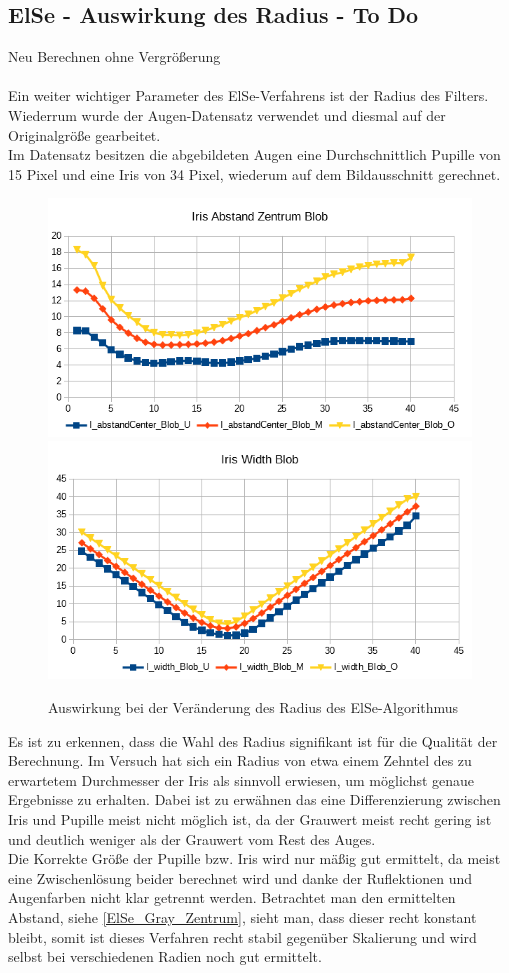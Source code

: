 \subsection{ElSe - Auswirkung des Radius - To Do}
Neu Berechnen ohne Vergrößerung\\\\
Ein weiter wichtiger Parameter des ElSe-Verfahrens ist der Radius des Filters. Wiederrum wurde der Augen-Datensatz \cite{database_Eye} verwendet und diesmal auf der Originalgröße gearbeitet.\\
Im Datensatz besitzen die abgebildeten Augen eine Durchschnittlich Pupille von 15 Pixel und eine Iris von 34 Pixel, wiederum auf dem Bildausschnitt gerechnet.
\begin{figure}
	\centering
	\includegraphics[width=0.45\linewidth]{ElSe_Img/Gray_Alt_Abst}
	\includegraphics[width=0.45\linewidth]{ElSe_Img/Gray_Alt_Wid}
	\caption{Auswirkung bei der Veränderung des Radius des ElSe-Algorithmus}
	\label{ElSE_Radius}
\end{figure}
Es ist zu erkennen, dass die Wahl des Radius signifikant ist für die Qualität der Berechnung. Im Versuch hat sich ein Radius von etwa einem Zehntel des zu erwartetem Durchmesser der Iris als sinnvoll erwiesen, um möglichst genaue Ergebnisse zu erhalten. Dabei ist zu erwähnen das eine Differenzierung zwischen Iris und Pupille meist nicht möglich ist, da der Grauwert meist recht gering ist und deutlich weniger als der Grauwert vom Rest des Auges.\\
Die Korrekte Größe der Pupille bzw. Iris wird nur mäßig gut ermittelt, da meist eine Zwischenlösung beider berechnet wird und danke der Ruflektionen und Augenfarben nicht klar getrennt werden. Betrachtet man den ermittelten Abstand, siehe \autoref{ElSe_Gray_Zentrum}, sieht man, dass dieser recht konstant bleibt, somit ist dieses Verfahren recht stabil gegenüber Skalierung und wird selbst bei verschiedenen Radien noch gut ermittelt.
